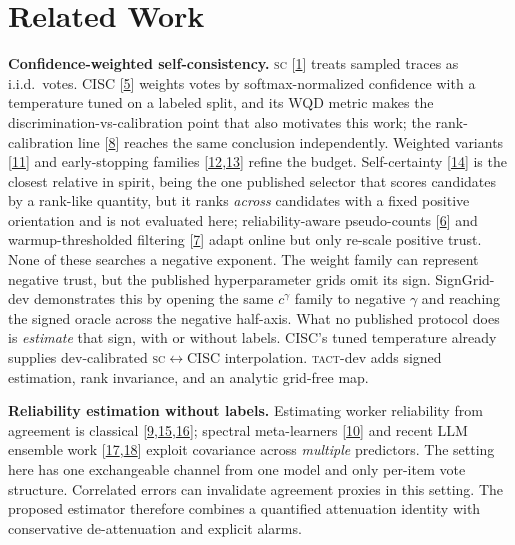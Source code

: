 \documentclass[conference]{IEEEtran}
\newcommand{\SC}{\textsc{sc}}
\newcommand{\TACT}{\textsc{tact}}
\begin{document}
\section{Related Work}\label{sec:related}

\textbf{Confidence-weighted self-consistency.} \SC{} [\hyperlink{bib:wang2023selfconsistency}{1}] treats sampled traces as i.i.d.\ votes. CISC [\hyperlink{bib:taubenfeld2025cisc}{5}] weights votes by softmax-normalized confidence with a temperature tuned on a labeled split, and its WQD metric makes the discrimination-vs-calibration point that also motivates this work; the rank-calibration line [\hyperlink{bib:huang2024rankcalibration}{8}] reaches the same conclusion independently. Weighted variants [\hyperlink{bib:li2023diverse}{11}] and early-stopping families
[\hyperlink{bib:aggarwal2023adaptive}{12},\hyperlink{bib:li2024escape}{13}] refine the budget. Self-certainty
[\hyperlink{bib:borda2025}{14}] is the closest relative in spirit, being the one published
selector that scores candidates by a rank-like quantity, but it ranks \emph{across} candidates with a fixed positive
orientation and is not evaluated here; reliability-aware pseudo-counts [\hyperlink{bib:reasc2026}{6}] and warmup-thresholded filtering [\hyperlink{bib:deepconf2025}{7}] adapt online but only re-scale positive trust. None of these searches a negative exponent. The
weight family can represent negative trust, but the published hyperparameter
grids omit its sign. SignGrid-dev demonstrates this by opening the same $c^{\gamma}$ family to
negative $\gamma$ and reaching the signed oracle across the negative half-axis.
What no published protocol does is \emph{estimate} that sign, with or without
labels. CISC's tuned temperature already supplies dev-calibrated
\SC$\leftrightarrow$CISC interpolation. \TACT-dev adds signed estimation, rank
invariance, and an analytic grid-free map.

\textbf{Reliability estimation without labels.} Estimating worker reliability from agreement is classical [\hyperlink{bib:dawid1979maximum}{9},\hyperlink{bib:whitehill2009whose}{15},\hyperlink{bib:karger2011iterative}{16}]; spectral meta-learners [\hyperlink{bib:parisi2014ranking}{10}] and recent LLM ensemble work [\hyperlink{bib:fuse2026}{17},\hyperlink{bib:beyondmajority2025}{18}] exploit covariance across \emph{multiple} predictors. The setting here has one exchangeable channel from one model and only per-item vote structure. Correlated errors can invalidate agreement proxies in this setting. The proposed estimator therefore combines a quantified attenuation identity with conservative de-attenuation and explicit alarms.
\end{document}
